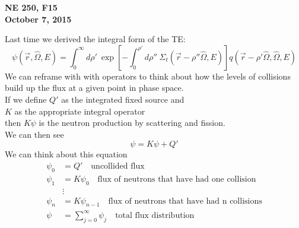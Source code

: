 \documentclass[12pt]{article}
\newcommand{\rvec}{\ensuremath{\vec{r}}}
\newcommand{\vOmega}{\ensuremath{\hat{\Omega}}}
\begin{document}
\begin{center}
{\bf NE 250, F15\\
October 7, 2015 
}
\end{center}

Last time we derived the integral form of the TE:
\begin{equation}
\psi(\rvec, \vOmega, E) =\int_0^{\infty} d\rho' \:\exp[-\int_0^{\rho'} d\rho'' \: \Sigma_t(\rvec-\rho''\vOmega,E)]q(\rvec-\rho'\vOmega,\vOmega,E)
\label{eq:integral}
\end{equation}
%
We can reframe with with operators to think about how the levels of collisions build up the flux at a given point in phase space.\\
If we define $Q'$ as the integrated fixed source and\\
$K$ as the appropriate integral operator \\
then $K\psi$ is the neutron production by scattering and fission. \\
We can then see
\[\psi = K \psi + Q'\]
We can think about this equation 
\begin{align*}
\psi_0 &= Q' \quad \text{uncollided flux}\\
\psi_1 &= K \psi_0 \quad \text{flux of neutrons that have had one collision}\\
&\vdots \\
\psi_n &= K \psi_{n-1} \quad \text{flux of neutrons that have had n collisions} \\
\psi &= \sum_{j=0}^{\infty} \psi_j \quad \text{total flux distribution}
\end{align*}
\end{document}
